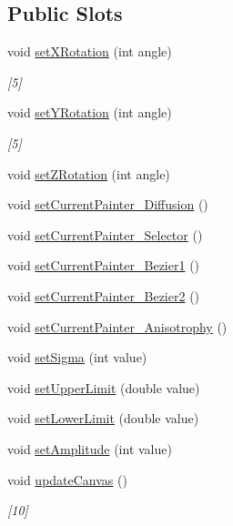 \subsection*{Public Slots}
\begin{DoxyCompactItemize}
\item 
void \hyperlink{class_diffusion_painter_a2c914637778dac04b998f66084bf68c2}{set\+X\+Rotation} (int angle)
\begin{DoxyCompactList}\small\item\em \mbox{[}5\mbox{]} \end{DoxyCompactList}\item 
void \hyperlink{class_diffusion_painter_a14bfd44d0c65a6b8a70121a65d25f5fa}{set\+Y\+Rotation} (int angle)
\begin{DoxyCompactList}\small\item\em \mbox{[}5\mbox{]} \end{DoxyCompactList}\item 
void \hyperlink{class_diffusion_painter_a3a33e4601571657252b56fada7ed0a80}{set\+Z\+Rotation} (int angle)
\item 
void \hyperlink{class_diffusion_painter_a45977cebc1e59c5067c00f6179899be5}{set\+Current\+Painter\+\_\+\+Diffusion} ()
\item 
void \hyperlink{class_diffusion_painter_af6c1819f308806fef7583efcc1999f1c}{set\+Current\+Painter\+\_\+\+Selector} ()
\item 
void \hyperlink{class_diffusion_painter_ab7f54b0f193a334bf9e34df65560bffa}{set\+Current\+Painter\+\_\+\+Bezier1} ()
\item 
void \hyperlink{class_diffusion_painter_a8c88f685894a212dad8d1719d8753d2f}{set\+Current\+Painter\+\_\+\+Bezier2} ()
\item 
void \hyperlink{class_diffusion_painter_af00f71174aaa3bb3d7e7c6273d5cacb9}{set\+Current\+Painter\+\_\+\+Anisotrophy} ()
\item 
void \hyperlink{class_diffusion_painter_acf3d7da78c5ffb2b129d951ec80e1bc6}{set\+Sigma} (int value)
\item 
void \hyperlink{class_diffusion_painter_a8d4c6a4de96dae6b77cbf7cf21e0fe59}{set\+Upper\+Limit} (double value)
\item 
void \hyperlink{class_diffusion_painter_a2c1af0a12e7a22b239fa0fa7587babe9}{set\+Lower\+Limit} (double value)
\item 
void \hyperlink{class_diffusion_painter_abaa3b7e44c4494471bc22117661ba51f}{set\+Amplitude} (int value)
\item 
void \hyperlink{class_diffusion_painter_af5b4e33b0f9b840e2c510283d4dba68b}{update\+Canvas} ()
\begin{DoxyCompactList}\small\item\em \mbox{[}10\mbox{]} \end{DoxyCompactList}\end{DoxyCompactItemize}
